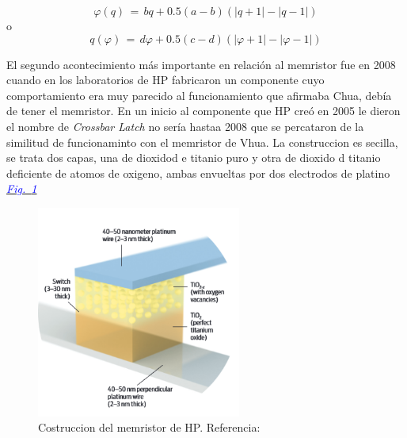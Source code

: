 \documentclass[12pt,a4paper]{report} %
\newcommand{\fref}[1]{\hyperref[#1]{\textcolor{blue}{\textit{Fig.~\ref*{#1}}}}}
\begin{document}
	\begin{equation}
		\varphi(q)\,=\,bq+0.5(a-b)(|q+1|-|q-1|)
		\label{eq:fq}
	\end{equation}\smallskip
	o
	\begin{equation}
		q(\varphi)\,=\,d\varphi+0.5(c-d)(|\varphi+1|-|\varphi-1|)
		\label{eq:qf}
	\end{equation}\smallskip
	
	\newpage
	
	El segundo acontecimiento más importante en relación al memristor fue en 2008 cuando en los laboratorios de HP fabricaron un componente cuyo comportamiento era muy parecido al funcionamiento que afirmaba Chua, debía de tener el memristor. En un inicio al componente que HP creó en 2005 le dieron el nombre de \textit{Crossbar Latch} no sería hastaa 2008 que se percataron de la similitud de funcionaminto con el memristor de Vhua. La construccion es secilla, se trata dos capas, una de dioxidod e titanio puro y otra de dioxido d titanio deficiente de atomos de oxigeno, ambas envueltas por dos electrodos de platino \fref{fig:mem1}
	
	\begin{figure}[h]
		\centering
		\includegraphics[width=0.6\textwidth]{mem1.png}
		\caption{Costruccion del memristor de HP. Referencia: \cite{williams}}
		\label{fig:mem1}
	\end{figure}
	
\end{document}
